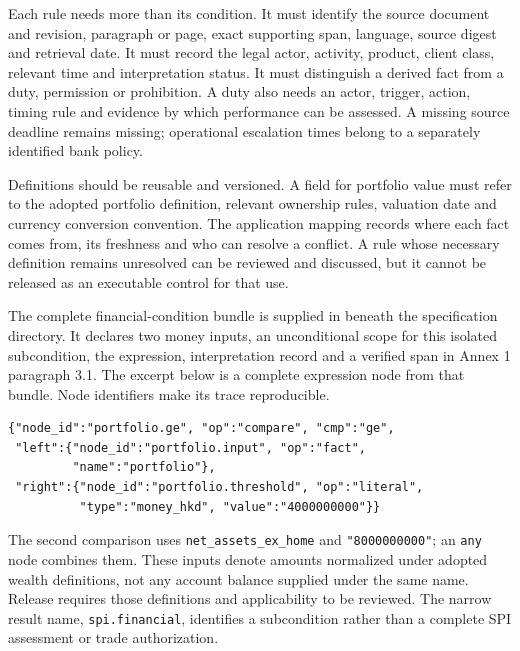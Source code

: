 \documentclass[12pt,a4paper,oneside,openany]{book}
\begin{document}
Each rule needs more than its condition. It must identify the source document and
revision, paragraph or page, exact supporting span, language, source digest and
retrieval date. It must record the legal actor, activity, product, client class,
relevant time and interpretation status. It must distinguish a derived fact from
a duty, permission or prohibition. A duty also needs an actor, trigger, action,
timing rule and evidence by which performance can be assessed. A missing source
deadline remains missing; operational escalation times belong to a separately
identified bank policy.

Definitions should be reusable and versioned. A field for portfolio value must
refer to the adopted portfolio definition, relevant ownership rules, valuation
date and currency conversion convention. The application mapping records where
each fact comes from, its freshness and who can resolve a conflict. A rule whose
necessary definition remains unresolved can be reviewed and discussed, but it
cannot be released as an executable control for that use.

The complete financial-condition bundle is supplied in
 beneath the specification directory.
It declares two money inputs, an unconditional scope for this isolated
subcondition, the expression, interpretation record and a verified span in
Annex 1 paragraph 3.1. The excerpt below is a complete expression node from
that bundle. Node identifiers make its trace reproducible.

\begin{minipage}{\textwidth}
\begin{lstlisting}[caption={The portfolio comparison in the supplied JSON bundle. Amounts are HK cents.}]
{"node_id":"portfolio.ge", "op":"compare", "cmp":"ge",
 "left":{"node_id":"portfolio.input", "op":"fact",
         "name":"portfolio"},
 "right":{"node_id":"portfolio.threshold", "op":"literal",
          "type":"money_hkd", "value":"4000000000"}}
\end{lstlisting}
\end{minipage}

The second comparison uses \texttt{net\_assets\_ex\_home} and
\texttt{"8000000000"}; an \texttt{any} node combines them. These inputs denote
amounts normalized under adopted wealth definitions, not any account balance
supplied under the same name. Release requires those definitions and applicability
to be reviewed. The narrow result name, \texttt{spi.financial}, identifies a
subcondition rather than a complete SPI assessment or trade authorization.
\end{document}
